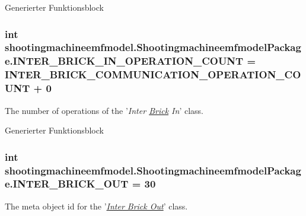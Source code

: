 Generierter Funktionsblock  \hypertarget{interfaceshootingmachineemfmodel_1_1_shootingmachineemfmodel_package_ae45162b06be73d468fa3ca17e605386b}{
\subsubsection[{I\-N\-T\-E\-R\-\_\-\-B\-R\-I\-C\-K\-\_\-\-I\-N\-\_\-\-O\-P\-E\-R\-A\-T\-I\-O\-N\-\_\-\-C\-O\-U\-N\-T}]{\setlength{\rightskip}{0pt plus 5cm}int shootingmachineemfmodel.\-Shootingmachineemfmodel\-Package.\-I\-N\-T\-E\-R\-\_\-\-B\-R\-I\-C\-K\-\_\-\-I\-N\-\_\-\-O\-P\-E\-R\-A\-T\-I\-O\-N\-\_\-\-C\-O\-U\-N\-T = {\bf I\-N\-T\-E\-R\-\_\-\-B\-R\-I\-C\-K\-\_\-\-C\-O\-M\-M\-U\-N\-I\-C\-A\-T\-I\-O\-N\-\_\-\-O\-P\-E\-R\-A\-T\-I\-O\-N\-\_\-\-C\-O\-U\-N\-T} + 0}}\label{interfaceshootingmachineemfmodel_1_1_shootingmachineemfmodel_package_ae45162b06be73d468fa3ca17e605386b}
The number of operations of the '{\itshape Inter \hyperlink{interfaceshootingmachineemfmodel_1_1_brick}{Brick} In}' class.

Generierter Funktionsblock  \hypertarget{interfaceshootingmachineemfmodel_1_1_shootingmachineemfmodel_package_a5a45c2cf9d3a86925ddc1576e9a6a067}{
\subsubsection[{I\-N\-T\-E\-R\-\_\-\-B\-R\-I\-C\-K\-\_\-\-O\-U\-T}]{\setlength{\rightskip}{0pt plus 5cm}int shootingmachineemfmodel.\-Shootingmachineemfmodel\-Package.\-I\-N\-T\-E\-R\-\_\-\-B\-R\-I\-C\-K\-\_\-\-O\-U\-T = 30}}\label{interfaceshootingmachineemfmodel_1_1_shootingmachineemfmodel_package_a5a45c2cf9d3a86925ddc1576e9a6a067}
The meta object id for the '\hyperlink{classshootingmachineemfmodel_1_1impl_1_1_inter_brick_out_impl}{{\itshape Inter Brick Out}}' class.

